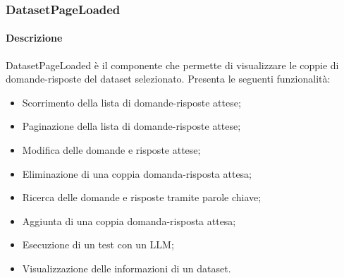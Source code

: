 \subsubsection{DatasetPageLoaded}
\label{sec:DatasetPageLoaded}
\paragraph{Descrizione}
DatasetPageLoaded è il componente che permette di visualizzare le coppie di domande-risposte del dataset selezionato. Presenta le seguenti funzionalità:
\begin{itemize}
    \item Scorrimento della lista di domande-risposte attese;
    \item Paginazione della lista di domande-risposte attese;
    \item Modifica delle domande e risposte attese;
    \item Eliminazione di una coppia domanda-risposta attesa;
    \item Ricerca delle domande e risposte tramite parole chiave;
    \item Aggiunta di una coppia domanda-risposta attesa;
    \item Esecuzione di un test con un LLM;
    \item Visualizzazione delle informazioni di un dataset.
\end{itemize}
